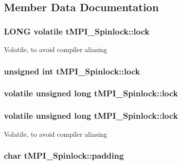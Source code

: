 \subsection{\-Member \-Data \-Documentation}
\hypertarget{structtMPI__Spinlock_a7c60d07e1a16d33c77f769a2d8bc9e6e}{
\subsubsection[{lock}]{\setlength{\rightskip}{0pt plus 5cm}\-L\-O\-N\-G volatile {\bf t\-M\-P\-I\-\_\-\-Spinlock\-::lock}}}\label{structtMPI__Spinlock_a7c60d07e1a16d33c77f769a2d8bc9e6e}
\-Volatile, to avoid compiler aliasing \hypertarget{structtMPI__Spinlock_a30a2c21d35a451723a3fd1dcbbfbb471}{
\subsubsection[{lock}]{\setlength{\rightskip}{0pt plus 5cm}unsigned int {\bf t\-M\-P\-I\-\_\-\-Spinlock\-::lock}}}\label{structtMPI__Spinlock_a30a2c21d35a451723a3fd1dcbbfbb471}
\hypertarget{structtMPI__Spinlock_ae208ed28e201a43a82eb1e30ceb58525}{
\subsubsection[{lock}]{\setlength{\rightskip}{0pt plus 5cm}volatile unsigned long {\bf t\-M\-P\-I\-\_\-\-Spinlock\-::lock}}}\label{structtMPI__Spinlock_ae208ed28e201a43a82eb1e30ceb58525}
\hypertarget{structtMPI__Spinlock_ae208ed28e201a43a82eb1e30ceb58525}{
\subsubsection[{lock}]{\setlength{\rightskip}{0pt plus 5cm}volatile unsigned long {\bf t\-M\-P\-I\-\_\-\-Spinlock\-::lock}}}\label{structtMPI__Spinlock_ae208ed28e201a43a82eb1e30ceb58525}
\-Volatile, to avoid compiler aliasing \hypertarget{structtMPI__Spinlock_a47d3018a35301f4841b9615c0e696bc0}{
\subsubsection[{padding}]{\setlength{\rightskip}{0pt plus 5cm}char {\bf t\-M\-P\-I\-\_\-\-Spinlock\-::padding}}}\label{structtMPI__Spinlock_a47d3018a35301f4841b9615c0e696bc0}


